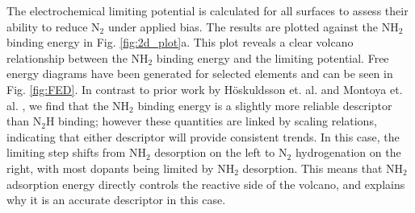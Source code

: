 

The electrochemical limiting potential is calculated for all surfaces to assess their ability to reduce N$_2$ under applied bias. The results are plotted against the NH$_2$ binding energy in Fig. \ref{fig:2d_plot}a. This plot reveals a clear volcano relationship between the NH$_2$ binding energy and the limiting potential. Free energy diagrams have been generated for selected elements and can be seen in Fig. \ref{fig:FED}. In contrast to prior work by H\"oskuldsson et. al.\cite{Hoskuldsson_2017} and Montoya et. al. \cite{Montoya_2015}, we find that the NH$_2$ binding energy is a slightly more reliable descriptor than N$_2$H binding; however these quantities are linked by scaling relations, indicating that either descriptor will provide consistent trends. In this case, the limiting step shifts from NH$_2$ desorption on the left to N$_2$ hydrogenation on the right, with most dopants being limited by NH$_2$ desorption. This means that NH$_2$ adsorption energy directly controls the reactive side of the volcano, and explains why it is an accurate descriptor in this case. 

